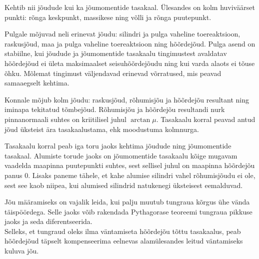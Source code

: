 \documentclass[10pt]{article}
\begin{document}
{%

\hint
Kehtib nii jõudude kui ka jõumomentide tasakaal. Ülesandes on kolm huviväärset punkti: rõnga keskpunkt, massikese ning võlli ja rõnga puutepunkt.
\probend
\bigskip


\hint
Pulgale mõjuvad neli erinevat jõudu: silindri ja pulga vaheline toereaktsioon, raskusjõud, maa ja pulga vaheline toereaktsioon ning hõõrdejõud. Pulga asend on stabiilne, kui jõudude ja jõumomentide tasakaalu tingimustest avaldatav hõõrdejõud ei ületa maksimaalset seisuhõõrdejõudu ning kui varda alaots ei tõuse õhku. Mõlemat tingimust väljendavad erinevad võrratused, mis peavad samaaegselt kehtima.
\probend
\bigskip


\hint
Konnale mõjub kolm jõudu: raskusjõud, rõhumisjõu ja hõõrdejõu resultant ning iminapa tekitatud tõmbejõud. Rõhumisjõu ja hõõrdejõu resultandi nurk pinnanormaali suhtes on kriitilisel juhul $\arctan \mu$. Tasakaalu korral peavad antud jõud üksteist ära tasakaalustama, ehk moodustuma kolmnurga.
\probend
\bigskip


\hint
Tasakaalu korral peab iga toru jaoks kehtima jõudude ning jõumomentide tasakaal. Alumiste torude jaoks on jõumomentide tasakaalu kõige mugavam vaadelda maapinna puutepunkti suhtes, sest sellisel juhul on maapinna hõõrdejõu panus \num{0}. Lisaks paneme tähele, et kahe alumise silindri vahel rõhumisjõudu ei ole, sest see kaob niipea, kui alumised silindrid natukenegi üksteisest eemalduvad.
\probend
\bigskip


\hint
\osa Jõu määramiseks on vajalik leida, kui palju muutub tungraua kõrgus ühe vända täispöördega. Selle jaoks võib rakendada Pythagorase teoreemi tungraua pikkuse jaoks ja seda diferentseerida.\\
\osa Selleks, et tungraud oleks ilma väntamiseta hõõrdejõu tõttu tasakaalus, peab hõõrdejõud täpselt kompenseerima eelnevas alamülesandes leitud väntamiseks kuluva jõu.
\probend
\bigskip

}
\end{document}
